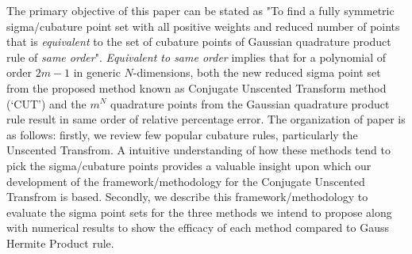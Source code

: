 \documentclass[letterpaper, 10 pt, conference]{IEEEtran}  %
\begin{document}
 The primary objective of this paper can be stated as "To find a fully symmetric sigma/cubature point set with all positive weights and reduced number of points that is \emph{equivalent} to the set of cubature points of Gaussian quadrature product rule of \emph{same order}". \emph{Equivalent to same order} implies that for a polynomial of order $2m-1$ in generic $N$-dimensions, both the new reduced sigma point set from the proposed method known as Conjugate Unscented Transform method (`CUT') and the $m^N$ quadrature points from the Gaussian quadrature product rule result in same order of relative percentage error. The organization of paper is as follows: firstly, we review few popular cubature rules, particularly the Unscented Transfrom. A intuitive understanding of how these methods tend to pick the sigma/cubature points provides a valuable insight upon which our development of the framework/methodology for the Conjugate Unscented Transfrom is based. Secondly, we describe this framework/methodology to evaluate the sigma point sets for the three methods we intend to propose along with numerical results to show the efficacy of each method compared to Gauss Hermite Product rule. 
\end{document}
